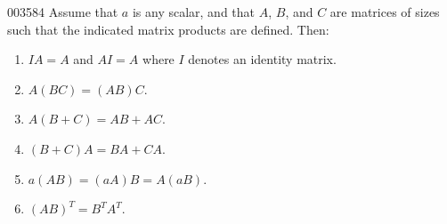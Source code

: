 \begin{theorem}{}{003584}
Assume that $a$ is any scalar, and that $A$, $B$, and $C$ are matrices of sizes such that the indicated matrix products are defined. Then:
\begin{multicols}{2}
\begin{enumerate}
\item $IA = A$ and $AI = A$ where $I$ denotes an identity matrix.

\item $A(BC) = (AB)C$.

\item $A(B + C) = AB + AC$.

\item $(B + C)A = BA + CA$.

\item $a(AB) = (aA)B = A(aB)$.

\item $(AB)^{T} = B^{T}A^{T}$.
\end{enumerate}
\end{multicols}
\vspace*{0.005em}
\end{theorem}

